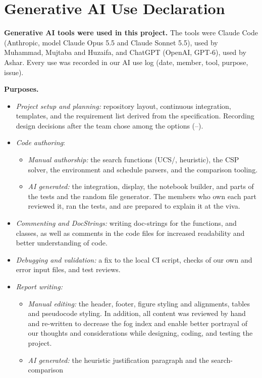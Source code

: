 \section{Generative AI Use Declaration}

\textbf{Generative AI tools were used in this project.} The tools were Claude Code (Anthropic, model
Claude Opus 5.5 and Claude Sonnet 5.5), used by Muhammad, Mujtaba and Huzaifa, and ChatGPT (OpenAI, GPT-6), used by Ashar.
Every use was recorded in our AI use log (date, member, tool, purpose, issue).

\textbf{Purposes.}
\begin{itemize}
  \item \emph{Project setup and planning:} repository layout, continuous integration, templates, and
    the requirement list derived from the specification. Recording design decisions after the team
    chose among the options (--).
  \item \emph{Code authoring}: 
    \begin{itemize}
      \item \emph{Manual authorship:} the search functions (UCS/\astar, heuristic), the CSP solver, the environment and schedule parsers, and the comparison tooling.
      \item \emph{AI generated:} the integration, display, the notebook builder, and parts of the tests and the random file
    generator. The members who own each part reviewed it, ran the tests, and are prepared to explain it at the viva.
    \end{itemize}
  \item \emph{Commenting and DocStrings:} writing doc-strings for the functions, and classes, as well as comments in the code files for increased readability and better understanding of code.
  \item \emph{Debugging and validation:} a fix to the local CI script, checks of our own and error
    input files, and test reviews.
  \item \emph{Report writing:} 
    \begin{itemize}
      \item \emph{Manual editing:} the header, footer, figure styling and alignments, tables and pseudocode styling. In addition, all content was reviewed by hand and re-written to decrease the fog index and enable better portrayal of our thoughts and considerations while designing, coding, and testing the project.
      \item \emph{AI generated:} the heuristic justification paragraph and the search-comparison

\end{itemize}
\end{itemize}
